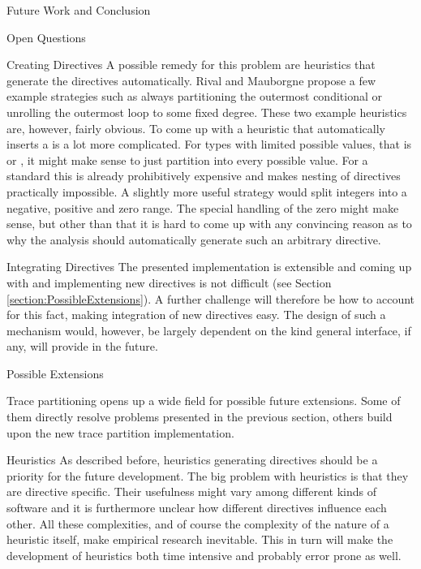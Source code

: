 \begin{chapter}{Future Work and Conclusion}
\begin{section}{Open Questions}
\begin{subsection}{Creating Directives}
			A possible remedy for this problem are heuristics that generate the directives automatically. Rival and Mauborgne propose a few example strategies such as always partitioning the outermost conditional or unrolling the outermost loop to some fixed degree. These two example heuristics are, however, fairly obvious. To come up with a heuristic that automatically inserts a  is a lot more complicated. For types with limited possible values, that is  or , it might make sense to just partition into every possible value. For a standard  this is already prohibitively expensive and makes nesting of directives practically impossible. A slightly more useful strategy would split integers into a negative, positive and zero range. The special handling of the zero might make sense, but other than that it is hard to come up with any convincing reason as to why the analysis should automatically generate such an arbitrary directive.
		\end{subsection}


		\begin{subsection}{Integrating Directives}
			The presented implementation is extensible and coming up with and implementing new directives is not difficult (see Section \ref{section:PossibleExtensions}). A further challenge will therefore be how to account for this fact, making integration of new directives easy. The design of such a mechanism would, however, be largely dependent on the kind general interface, if any, \sample will provide in the future.
		\end{subsection}
	\end{section}


	\begin{section}{Possible Extensions}
		\label{section:PossibleExtensions}

		Trace partitioning opens up a wide field for possible future extensions. Some of them directly resolve problems presented in the previous section, others build upon the new trace partition implementation.


		\begin{subsection}{Heuristics}
			As described before, heuristics generating directives should be a priority for the future development. The big problem with heuristics is that they are directive specific. Their usefulness might vary among different kinds of software and it is furthermore unclear how different directives influence each other. All these complexities, and of course the complexity of the nature of a heuristic itself, make empirical research inevitable. This in turn will make the development of heuristics both time intensive and probably error prone as well.
		\end{subsection}


\end{section}
\end{chapter}

